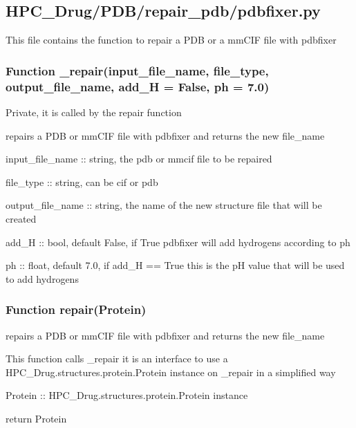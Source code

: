 

\subsection{HPC\_Drug/PDB/repair\_pdb/pdbfixer.py}

    This file contains the function to repair a PDB or a mmCIF file with pdbfixer

    \subsubsection{Function \_repair(input\_file\_name, file\_type, output\_file\_name, add\_H = False, ph = 7.0)}

        Private, it is called by the repair function

        repairs a PDB or mmCIF file with pdbfixer and returns the new file\_name

        input\_file\_name :: string, the pdb or mmcif file to be repaired

        file\_type :: string, can be cif or pdb

        output\_file\_name :: string, the name of the new structure file that will be created

        add\_H :: bool, default False, if True pdbfixer will add hydrogens according to ph

        ph :: float, default 7.0, if add\_H == True this is the pH value that will be used to add hydrogens

    \subsubsection{Function repair(Protein)}

        repairs a PDB or mmCIF file with pdbfixer and returns the new file\_name

        This function calls \_repair it is an interface to use a
        HPC\_Drug.structures.protein.Protein instance on \_repair in a simplified way

        Protein :: HPC\_Drug.structures.protein.Protein instance

        return Protein
